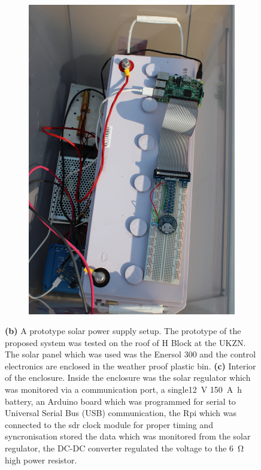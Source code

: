 \begin{figure}
\begin{subfigure}[t]{0.47\textwidth}
		\includegraphics[width=\linewidth]{Figures/rooftop2}
		\caption{} \label{Fig:rooftop2}
	\end{subfigure}
	\caption{{\bf (b)} A prototype solar power supply setup. The prototype of the proposed system was tested on the roof of H Block at the UKZN. The solar panel which was used was the Enersol 300 and the control electronics are enclosed in the weather proof plastic bin. {\bf (c)} Interior of the enclosure. Inside the enclosure was the solar regulator which was monitored via a communication port, a single\SI{12}{\volt} \SI{150}{\ampere \hour} battery, an Arduino board which was programmed for serial to Universal Serial Bus (USB) communication, the Rpi which was connected to the sdr clock module for proper timing and syncronisation stored the data which was monitored from the solar regulator, the DC-DC converter regulated the voltage to the \SI{6}{\ohm} high power resistor.} 
	\label{Fig:History}
\end{figure}

